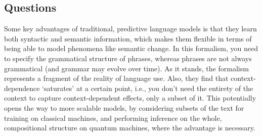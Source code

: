 \subsection*{Questions}

Some key advantages of traditional, predictive language models is that they learn both
syntactic and semantic information, which makes them flexible in terms of being able to
model phenomena like semantic change.
In this formalism, you need to specify the grammatical structure of phrases, whereas
phrases are not always grammatical (and grammar may evolve over time).
As it stands, the formalism represents a fragment of the reality of language use.
Also, they find that context-dependence `saturates' at a certain point, i.e., you don't
need the entirety of the context to capture context-dependent effects, only a subset of
it.
This potentially opens the way to more scalable models, by considering subsets of the
text for training on classical machines, and performing inference on the whole,
compositional structure on quantum machines, where the advantage is necessary.
